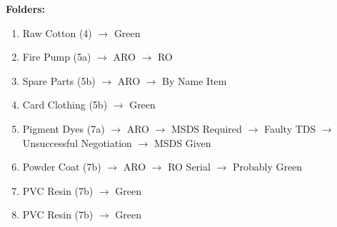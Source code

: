 \documentclass[12pt]{article}
\begin{document}
\noindent
\textbf{Folders:}
\begin{enumerate}
\item
    Raw Cotton (4)
$\rightarrow$
Green

\item
    Fire Pump (5a)
$\rightarrow$
ARO
$\rightarrow$
RO

\item
    Spare Parts (5b)
$\rightarrow$
ARO
$\rightarrow$
By Name Item

\item
    Card Clothing (5b)
$\rightarrow$
Green

\item
    Pigment Dyes (7a)
$\rightarrow$
ARO
$\rightarrow$
MSDS Required
$\rightarrow$
Faulty TDS
$\rightarrow$
Unsuccessful Negotiation
$\rightarrow$
MSDS Given


\item
    Powder Coat (7b)
$\rightarrow$
ARO
$\rightarrow$
RO Serial
$\rightarrow$
Probably Green

\item
    PVC Resin (7b)
$\rightarrow$
Green

\item
PVC Resin (7b)
$\rightarrow$
Green



\end{enumerate}
\end{document}
